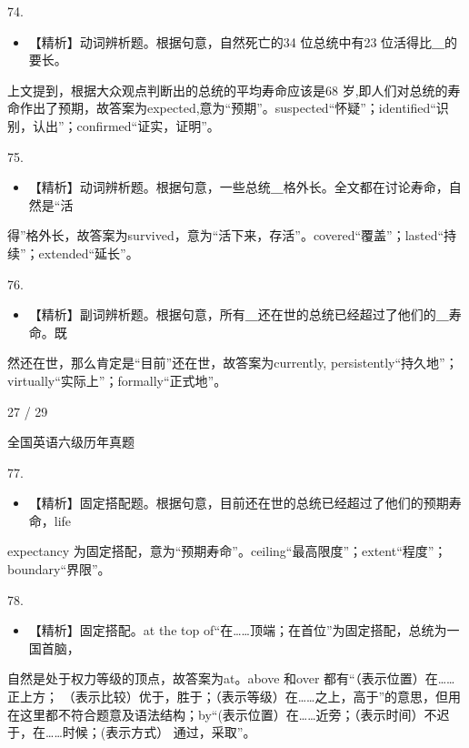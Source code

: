 \documentclass[UTF8,11pt]{ctexart}
\begin{document}
74.


\begin{itemize}[leftmargin=2em,itemsep=.2em,topsep=.4em]\item[B.] 【精析】动词辨析题。根据句意，自然死亡的34 位总统中有23 位活得比＿的要长。
\end{itemize}

上文提到，根据大众观点判断出的总统的平均寿命应该是68 岁,即人们对总统的寿命作出了预期，故答案为expected,意为“预期”。suspected“怀疑”；identified“识别，认出”；confirmed“证实，证明”。


75.


\begin{itemize}[leftmargin=2em,itemsep=.2em,topsep=.4em]\item[A.] 【精析】动词辨析题。根据句意，一些总统＿格外长。全文都在讨论寿命，自然是“活
\end{itemize}

得”格外长，故答案为survived，意为“活下来，存活”。covered“覆盖”；lasted“持续”；extended“延长”。


76.


\begin{itemize}[leftmargin=2em,itemsep=.2em,topsep=.4em]\item[D.] 【精析】副词辨析题。根据句意，所有＿还在世的总统已经超过了他们的＿寿命。既
\end{itemize}

然还在世，那么肯定是“目前”还在世，故答案为currently, persistently“持久地”；virtually“实际上”；formally“正式地”。


27 / 29


全国英语六级历年真题


77.


\begin{itemize}[leftmargin=2em,itemsep=.2em,topsep=.4em]\item[D.] 【精析】固定搭配题。根据句意，目前还在世的总统已经超过了他们的预期寿命，life
\end{itemize}

expectancy 为固定搭配，意为“预期寿命”。ceiling“最高限度”；extent“程度”；boundary“界限”。


78.


\begin{itemize}[leftmargin=2em,itemsep=.2em,topsep=.4em]\item[C.] 【精析】固定搭配。at the top of“在……顶端；在首位”为固定搭配，总统为一国首脑，
\end{itemize}

自然是处于权力等级的顶点，故答案为at。above 和over 都有“（表示位置）在……正上方； （表示比较）优于，胜于；（表示等级）在……之上，高于”的意思，但用在这里都不符合题意及语法结构；by“(表示位置）在……近旁；（表示时间）不迟于，在……时候；(表示方式） 通过，采取”。
\end{document}
